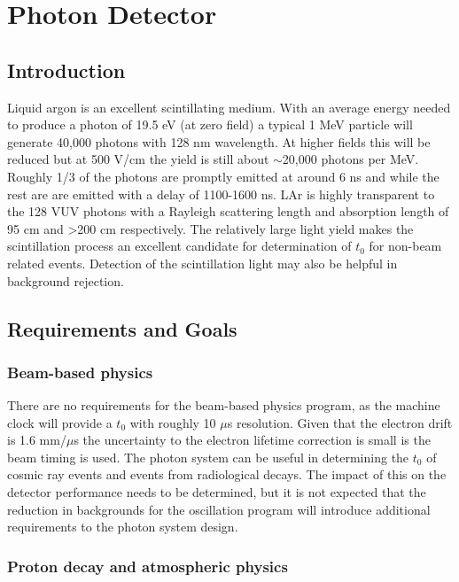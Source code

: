 \chapter{Photon Detector}
\label{ch:photon}
\section{Introduction}

Liquid argon is an excellent scintillating medium. With an average
energy needed to produce a photon of 19.5 eV (at zero field) a typical
1 MeV particle will generate 40,000 photons with 128 nm wavelength. At
higher fields this will be reduced but at 500 V/cm the yield is still
about $\sim$20,000 photons per MeV. Roughly 1/3 of the photons are
promptly emitted at around 6 ns and while the rest are are emitted
with a delay of 1100-1600 ns. LAr is highly transparent to the 128 VUV
photons with a Rayleigh scattering length and absorption length of 95
cm and >200 cm respectively. The relatively large light yield makes
the scintillation process an excellent candidate for determination of
$t_{0}$ for non-beam related events. Detection of the scintillation
light may also be helpful in background rejection.

\section{Requirements and Goals}

\subsection{Beam-based physics}

There are no requirements for the beam-based physics program, as the
machine clock will provide a $t_{0}$ with roughly 10 $\mu$s
resolution. Given that the electron drift is 1.6 mm/$\mu$s the
uncertainty to the electron lifetime correction is small is the beam
timing is used. The photon system can be useful in determining the
$t_{0}$ of cosmic ray events and events from radiological decays. The
impact of this on the detector performance needs to be determined, but
it is not expected that the reduction in backgrounds for the
oscillation program will introduce additional requirements to the
photon system design.

\subsection{Proton decay and atmospheric physics}

